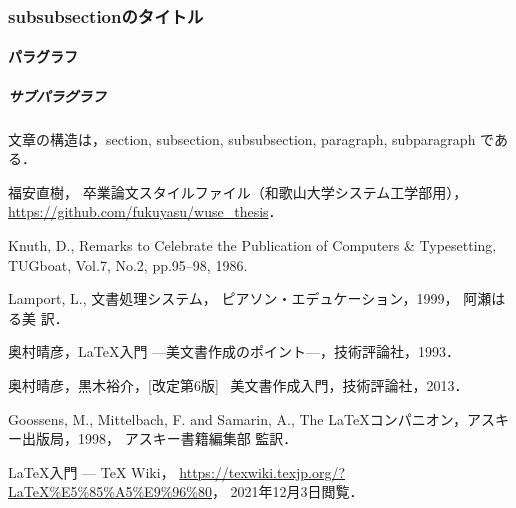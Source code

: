 \documentclass[twocolumn]{jarticle} %
\begin{document}
\subsubsection{subsubsectionのタイトル}

\paragraph{パラグラフ}

\subparagraph{サブパラグラフ}

文章の構造は，section, subsection, subsubsection, paragraph, subparagraph である．




\begin{thebibliography}{9}	%
  福安直樹，
  卒業論文スタイルファイル（和歌山大学システム工学部用），
  \url{https://github.com/fukuyasu/wuse_thesis}．

  Knuth, D.,
  Remarks to Celebrate the Publication of Computers \& Typesetting,
  TUGboat, Vol.7, No.2, pp.95--98, 1986.

  Lamport, L.,
  文書処理システム\LaTeXe{}，
  ピアソン・エデュケーション，1999，
  \newblock{}阿瀬はる美 訳．

  奥村晴彦，\LaTeX{}入門 ---美文書作成のポイント---，技術評論社，1993．

  奥村晴彦，黒木裕介，[改定第6版] \LaTeXe~美文書作成入門，技術評論社，2013．

  Goossens, M., Mittelbach, F. and Samarin, A.,
  The \LaTeX{}コンパニオン，アスキー出版局，1998，
  \newblock{}アスキー書籍編集部 監訳．

  \LaTeX 入門 --- \TeX{} Wiki，
  \url{https://texwiki.texjp.org/?LaTeX%E5%85%A5%E9%96%80}，
  2021年12月3日閲覧．
\end{thebibliography}

\end{document}
